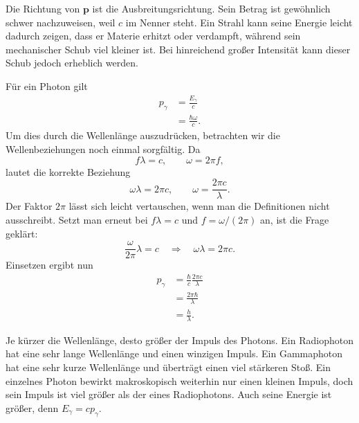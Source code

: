 Die Richtung von \(\mathbf p\) ist die Ausbreitungsrichtung. Sein Betrag ist gewöhnlich schwer nachzuweisen, weil \(c\) im Nenner steht. Ein Strahl kann seine Energie leicht dadurch zeigen, dass er Materie erhitzt oder verdampft, während sein mechanischer Schub viel kleiner ist. Bei hinreichend großer Intensität kann dieser Schub jedoch erheblich werden.

Für ein Photon gilt
\begin{align}
p_\gamma
&=\frac{E_\gamma}{c}\\
&=\frac{\hbar\omega}{c}.
\end{align}
Um dies durch die Wellenlänge auszudrücken, betrachten wir die Wellenbeziehungen noch einmal sorgfältig. Da
\begin{equation}
f\lambda=c,
\qquad
\omega=2\pi f,
\end{equation}
lautet die korrekte Beziehung
\begin{equation}
\omega\lambda=2\pi c,
\qquad
\omega=\frac{2\pi c}{\lambda}.
\end{equation}
Der Faktor \(2\pi\) lässt sich leicht vertauschen, wenn man die Definitionen nicht ausschreibt. Setzt man erneut bei \(f\lambda=c\) und \(f=\omega/(2\pi)\) an, ist die Frage geklärt:
\begin{equation}
\frac{\omega}{2\pi}\lambda=c
\quad\Longrightarrow\quad
\omega\lambda=2\pi c.
\end{equation}
Einsetzen ergibt nun
\begin{align}
p_\gamma
&=\frac{\hbar}{c}\frac{2\pi c}{\lambda}\\
&=\frac{2\pi\hbar}{\lambda}\\
&=\frac{h}{\lambda}.
\end{align}

\begin{classroomqa}
\end{classroomqa}

Je kürzer die Wellenlänge, desto größer der Impuls des Photons. Ein Radiophoton hat eine sehr lange Wellenlänge und einen winzigen Impuls. Ein Gammaphoton hat eine sehr kurze Wellenlänge und überträgt einen viel stärkeren Stoß. Ein einzelnes Photon bewirkt makroskopisch weiterhin nur einen kleinen Impuls, doch sein Impuls ist viel größer als der eines Radiophotons. Auch seine Energie ist größer, denn \(E_\gamma=cp_\gamma\).

